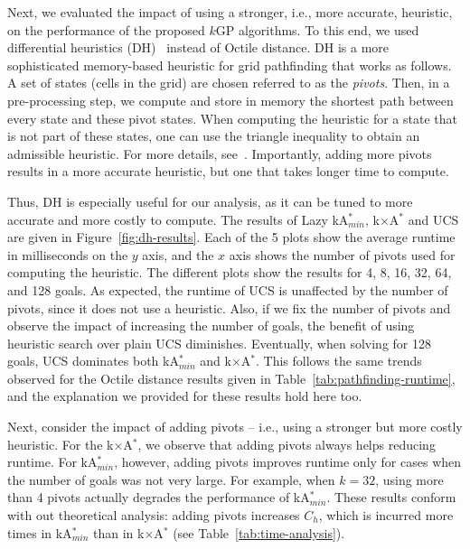 \documentclass{aicom2e}
\newcommand{\kgs}{$k$GP}
\newcommand{\kastarmin}{kA$^*_{min}$}
\newcommand{\kxastar}{k$\times$A$^*$}
\begin{document}
Next, we evaluated the impact of using a stronger, i.e., more accurate, heuristic, on the performance of the proposed \kgs{} algorithms. To this end, we used differential heuristics (DH)~\cite{goldberg2005computing,ng2002predicting,sturtevant2009memory} instead of Octile distance. DH is a more sophisticated memory-based heuristic for grid pathfinding that works as follows. A set of states (cells in the grid) are chosen  referred to as the {\em pivots}. Then, in a pre-processing step, we compute and store in memory the shortest path between every state and these pivot states. When computing the heuristic for a state that is not part of these states,
one can use the triangle inequality to obtain an admissible heuristic. For more details, see~\cite{goldberg2005computing,ng2002predicting,sturtevant2009memory}.
Importantly, adding more pivots results in a more accurate heuristic,
but one that takes longer time to compute.

Thus, DH is especially useful for our analysis, as it can be tuned to more accurate and more costly to compute. The results of Lazy \kastarmin{}, \kxastar{} and UCS are given in Figure~\ref{fig:dh-results}. Each of the 5 plots show the average runtime in milliseconds on the $y$ axis, and the $x$ axis shows the number of pivots used for computing the heuristic.
The different plots show the results for 4, 8, 16, 32, 64, and 128 goals.
As expected, the runtime of UCS is unaffected by the number of pivots, since it does not use a heuristic. Also, if we fix the number of pivots and observe the impact of increasing the number of goals, the benefit of using heuristic search over plain UCS diminishes. Eventually, when solving for 128 goals, UCS dominates both \kastarmin{} and \kxastar{}. This follows the same trends observed for the Octile distance results given in Table~\ref{tab:pathfinding-runtime}, and the explanation we provided for these results hold here too. %

Next, consider the impact of adding pivots -- i.e., using a stronger but more costly heuristic.
For the \kxastar{}, we observe that adding pivots always helps reducing runtime. For \kastarmin{}, however, adding pivots improves runtime only for cases when the number of goals was not very large. For example, when $k=32$, using more than 4 pivots actually degrades the performance of \kastarmin{}. These results conform with out theoretical analysis: adding pivots increases $C_h$, which is incurred more times in \kastarmin{} than in \kxastar{} (see Table~\ref{tab:time-analysis}).
\end{document}

